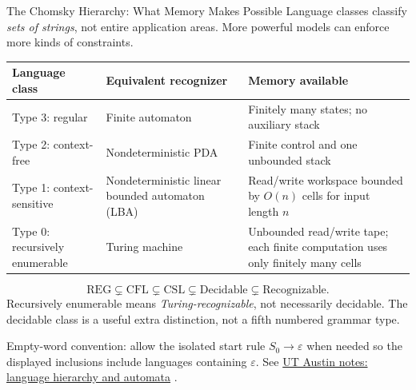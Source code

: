 \documentclass[10pt]{beamer}
\newcommand{\paperlink}[2]{%
  \href{#1}{\textcolor{blue!65!black}{#2}}%
}
\begin{document}
\begin{frame}{The Chomsky Hierarchy: What Memory Makes Possible}
  \small
  Language classes classify \emph{sets of strings}, not entire application
  areas. More powerful models can enforce more kinds of constraints.
  \begin{center}
  \begin{tabular}{L{2.6cm}L{3.0cm}L{4.3cm}}
    \toprule
    Language class & Equivalent recognizer & Memory available \\
    \midrule
    Type 3: regular & Finite automaton & Finitely many states; no auxiliary stack \\
    Type 2: context-free & Nondeterministic PDA & Finite control and one unbounded stack \\
    Type 1: context-sensitive & Nondeterministic linear bounded automaton (LBA)
      & Read/write workspace bounded by $O(n)$ cells for input length $n$ \\
    Type 0: recursively enumerable & Turing machine & Unbounded read/write tape;
      each finite computation uses only finitely many cells \\
    \bottomrule
  \end{tabular}
  \end{center}
  \pause
  \[
    \mathrm{REG}\subsetneq\mathrm{CFL}\subsetneq\mathrm{CSL}
      \subsetneq\mathrm{Decidable}\subsetneq\mathrm{Recognizable}.
  \]
  Recursively enumerable means \emph{Turing-recognizable}, not necessarily
  decidable. The decidable class is a useful extra distinction, not a fifth
  numbered grammar type.
  \par\smallskip
  {\scriptsize Empty-word convention: allow the isolated start rule
  $S_0\to\varepsilon$ when needed so the displayed inclusions include
  languages containing $\varepsilon$. See
  \paperlink{https://www.cs.utexas.edu/~cline/ear/automata/CS341-Fall-2004-Packet/1-LectureNotes.pdf}
  {UT Austin notes: language hierarchy and automata}.}
\end{frame}
\end{document}
